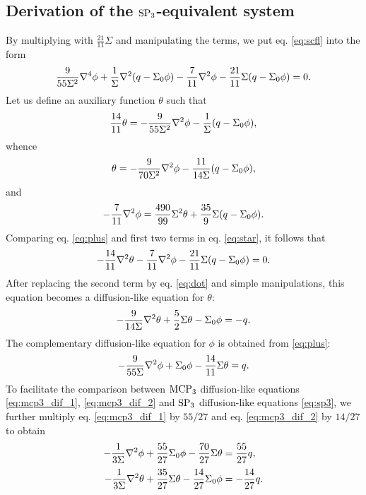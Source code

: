 \subsection{Derivation of the $\SPN[3]$-equivalent system}
By multiplying with $\frac{21}{11}\Sigma$ and manipulating the terms, we put eq. \eqref{eq:scfl} into the form
\begin{equation}\label{eq:star}
	\frac{9}{55\Sigma^2}\del^4\phi + \frac{1}{\Sigma}\lap(q-\Sigma_0\phi) - \frac{7}{11}\lap\phi - \frac{21}{11}\Sigma(q -
	\Sigma_0\phi) = 0.
\end{equation}
Let us define an auxiliary function $\theta$ such that
\begin{equation}\label{eq:plus}
	\frac{14}{11}\theta = -\frac{9}{55\Sigma^2}\lap\phi - \frac{1}{\Sigma}(q - \Sigma_0\phi),
\end{equation}
whence
\begin{equation}\label{eq:theta}
	\theta = -\frac{9}{70\Sigma^2}\lap\phi - \frac{11}{14\Sigma}(q - \Sigma_0\phi),
\end{equation}
and
\begin{equation}\label{eq:dot}
	-\frac{7}{11}\lap\phi = \frac{490}{99}\Sigma^2\theta + \frac{35}{9}\Sigma(q-\Sigma_0\phi).
\end{equation}
Comparing eq. \eqref{eq:plus} and first two terms in eq. \eqref{eq:star}, it follows that
$$
	-\frac{14}{11}\lap\theta - \frac{7}{11}\lap\phi - \frac{21}{11}\Sigma(q - \Sigma_0\phi) = 0.
$$
After replacing the second term by eq. \eqref{eq:dot} and simple manipulations, this equation becomes a diffusion-like
equation for $\theta$:
\begin{equation}\label{eq:mcp3_dif_2}
	-\frac{9}{14\Sigma}\lap\theta + \frac{5}{2}\Sigma\theta - \Sigma_0\phi = -q.
\end{equation}
The complementary diffusion-like equation for $\phi$ is obtained from \eqref{eq:plus}:
\begin{equation}\label{eq:mcp3_dif_1}
	-\frac{9}{55\Sigma}\lap\phi + \Sigma_0\phi - \frac{14}{11}\Sigma\theta = q.
\end{equation}
To facilitate the comparison between $\MCPN[3]$ diffusion-like equations \eqref{eq:mcp3_dif_1}, \eqref{eq:mcp3_dif_2} and
$\SPN[3]$ diffusion-like equations \eqref{eq:sp3}, we further multiply eq. \eqref{eq:mcp3_dif_1} by $55/27$ and eq.
\eqref{eq:mcp3_dif_2} by $14/27$ to obtain
\begin{equation}\label{eq:mcp3_dif}
	\begin{aligned}
		-\frac{1}{3\Sigma}\lap\phi + \frac{55}{27}\Sigma_0\phi - \frac{70}{27}\Sigma\theta  &= \frac{55}{27}q,  \\[.2em]
		-\frac{1}{3\Sigma}\lap\theta + \frac{35}{27}\Sigma\theta - \frac{14}{27}\Sigma_0\phi &= -\frac{14}{27}q.
	\end{aligned}
\end{equation}


